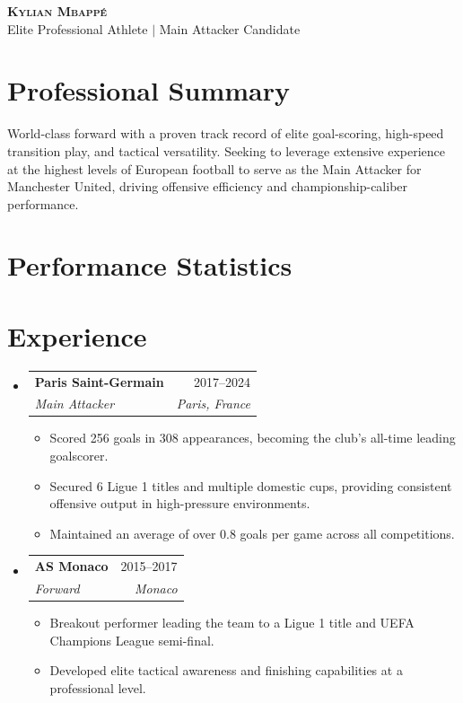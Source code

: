 \documentclass[letterpaper,11pt]{article}
\makeatletter
\newcommand{\resumeItem}[1]{
\item\small{
{#1 \vspace{-2pt}}
}
}
\newcommand{\resumeSubheading}[4]{
\vspace{-2pt}\item
\begin{tabular*}{0.97\textwidth}[t]{l@{\extracolsep{\fill}}r}
\textbf{#1} & #2 \\
\textit{\small#3} & \textit{\small #4} \\
\end{tabular*}\vspace{-7pt}
}
\newcommand{\resumeSubHeadingListStart}{\begin{itemize}[leftmargin=0.15in, label={}]}
\newcommand{\resumeSubHeadingListEnd}{\end{itemize}}
\newcommand{\resumeItemListStart}{\begin{itemize}}
\newcommand{\resumeItemListEnd}{\end{itemize}\vspace{-5pt}}
\makeatother
\begin{document}
\begin{center}
\textbf{\Huge \scshape Kylian Mbappé} \\ \vspace{5pt}
\small Elite Professional Athlete $|$ Main Attacker Candidate \\
\end{center}

\section{Professional Summary}
World-class forward with a proven track record of elite goal-scoring, high-speed transition play, and tactical versatility. Seeking to leverage extensive experience at the highest levels of European football to serve as the Main Attacker for Manchester United, driving offensive efficiency and championship-caliber performance.

\section{Performance Statistics}
\begin{center}
\end{center}

\section{Experience}
\resumeSubHeadingListStart
\resumeSubheading{Paris Saint-Germain}{2017--2024}{Main Attacker}{Paris, France}
\resumeItemListStart
\resumeItem{Scored 256 goals in 308 appearances, becoming the club's all-time leading goalscorer.}
\resumeItem{Secured 6 Ligue 1 titles and multiple domestic cups, providing consistent offensive output in high-pressure environments.}
\resumeItem{Maintained an average of over 0.8 goals per game across all competitions.}
\resumeItemListEnd

\resumeSubheading{AS Monaco}{2015--2017}{Forward}{Monaco}
\resumeItemListStart
\resumeItem{Breakout performer leading the team to a Ligue 1 title and UEFA Champions League semi-final.}
\resumeItem{Developed elite tactical awareness and finishing capabilities at a professional level.}
\resumeItemListEnd
\resumeSubHeadingListEnd
\end{document}
